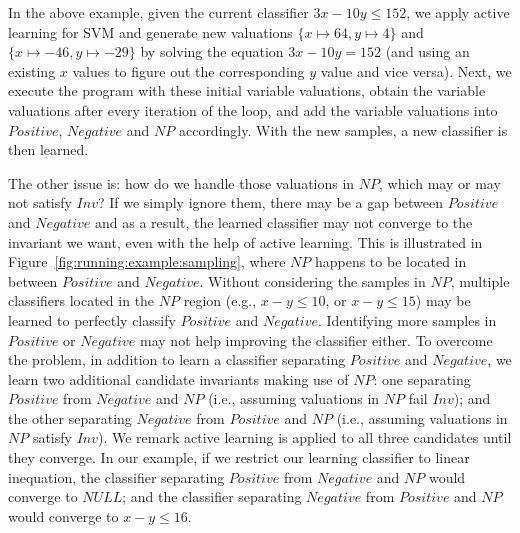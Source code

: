 \begin{example}
In the above example, given the current classifier $3x-10y \leq 152$, we apply active learning for SVM 
and generate new valuations $\{x \mapsto 64, y \mapsto 4\}$ and $\{x \mapsto -46, y \mapsto -29\}$ %
by solving the equation $3x-10y = 152$ (and using an existing $x$ values to figure out the corresponding $y$ value and vice versa). 
Next, we execute the program with these initial variable valuations, obtain the variable valuations after every iteration of the loop, and add the variable valuations into $\mathit{Positive}$, $\mathit{Negative}$ and $\mathit{NP}$ accordingly. 
With the new samples, a new classifier is then learned.
\end{example}
The other issue is: how do we handle those valuations in $\mathit{NP}$, which may or may not satisfy $\mathit{Inv}$? 
If we simply ignore them, there may be a gap between $\mathit{Positive}$ and $\mathit{Negative}$ and as a result, the learned classifier may not converge to the invariant we want, even with the help of active learning. 
This is illustrated in Figure~\ref{fig:running:example:sampling}, where $\mathit{NP}$ happens to be located in between $\mathit{Positive}$ and $\mathit{Negative}$. 
Without considering the samples in $\mathit{NP}$, multiple classifiers located in the $\mathit{NP}$ region (e.g., $x - y \leq 10$, or $x - y \leq 15$) may be learned to perfectly classify $\mathit{Positive}$ and $\mathit{Negative}$. 
Identifying more samples in $\mathit{Positive}$ or $\mathit{Negative}$ may not help improving the classifier either. 
To overcome the problem, in addition to learn a classifier separating $\mathit{Positive}$ and $\mathit{Negative}$, we learn two additional candidate invariants making use of $\mathit{NP}$: 
one separating $\mathit{Positive}$ from $\mathit{Negative}$ and $\mathit{NP}$ (i.e., assuming valuations in $\mathit{NP}$ fail $\mathit{Inv}$); 
and the other separating $\mathit{Negative}$ from $\mathit{Positive}$ and $\mathit{NP}$ (i.e., assuming valuations in $\mathit{NP}$ satisfy $\mathit{Inv}$). 
We remark active learning is applied to all three candidates until they converge. 
In our example, if we restrict our learning classifier to linear inequation, the classifier separating $\mathit{Positive}$ from $\mathit{Negative}$ and $\mathit{NP}$ would converge to $\mathit{NULL}$; %
and the classifier separating $\mathit{Negative}$ from $\mathit{Positive}$ and $\mathit{NP}$ would converge to $x - y \leq 16$.

